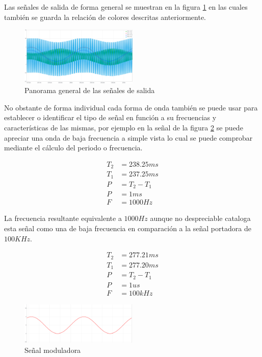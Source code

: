 \documentclass[conference]{IEEEtran}
\begin{document}
	Las señales de salida de forma general se muestran en la figura \ref{fig:seniales-etapa} en las cuales también se guarda la relación de colores descritas anteriormente.
	
	\begin{figure}[h]
		\centering
		\includegraphics[width=0.5\textwidth]{media/seniales-etapa}
		\caption{Panorama general de las señales de salida}
		\label{fig:seniales-etapa}
	\end{figure}
	
	No obstante de forma individual cada forma de onda también se puede usar para establecer o identificar el tipo de señal en función a su frecuencias y características de las mismas, por ejemplo en la señal de la figura \ref{fig:senial-moduladora} se puede apreciar una onda de baja frecuencia a simple vista lo cual se puede comprobar mediante el cálculo del periodo o frecuencia.
	
	\begin{align*}
		T_2 &= 238.25ms\\ 
		T_1 &= 237.25ms \\
		P  &= T_2 - T_1 \\
		P &= 1ms\\
		F &= 1000 Hz
	\end{align*}
	
	La frecuencia resultante equivalente a $1000 Hz$ aunque no despreciable cataloga esta señal como una de baja frecuencia en comparación a la señal portadora de $100K Hz$.
	
	\begin{align*}
		T_2 &= 277.21ms\\ 
		T_1 &= 277.20ms \\
		P  &= T_2 - T_1 \\
		P &= 1us\\
		F &= 100k Hz
	\end{align*}
	
	\begin{figure}[h]
		\centering
		\includegraphics[width=0.5\textwidth]{media/senial-moduladora}
		\caption{Señal moduladora}
		\label{fig:senial-moduladora}
	\end{figure}
	
\end{document}
